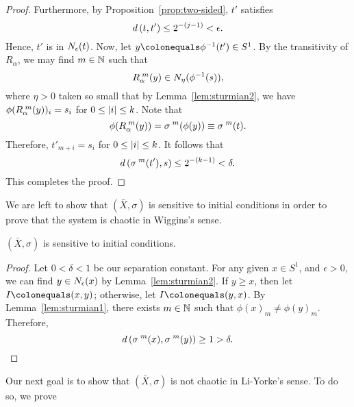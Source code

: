 \documentclass[10pt,twoside,draft]{book}
\begin{document}
\begin{example}
\begin{proposition}
\begin{proof}
      Furthermore, by Proposition~\ref{prop:two-sided}, $t'$ satisfies
      \begin{equation*}
        d\left( t, t' \right) \leq 2^{-(j-1)} < \epsilon.
      \end{equation*}
      Hence, $t'$ is in $N_{\epsilon}(t)$.
      Now, let $y \ceq \phi^{-1}(t') \in S^1$.
      By the transitivity of $R_\alpha$, we may find $m \in \mathbb{N}$ such that
      \begin{equation*}
        R_\alpha^{\;m}(y) \in N_{\eta}(\phi^{-1}(s)),
      \end{equation*}
      where $\eta > 0$ taken so small that by Lemma~\ref{lem:sturmian2}, we have 
      $\phi(R_\alpha^{\;m}(y))_i = s_i$ for $0 \leq \left | i \right | \leq k$.
      Note that
      \begin{equation*}
        \phi(R_\alpha^{\;m}(y)) 
        = \sigma^{\;m}(\phi(y))
        \equiv \sigma^{\;m}(t).
      \end{equation*}
      Therefore, $t'_{m+i} = s_i$ for $0 \leq \left | i \right | \leq k$.
      It follows that 
      \begin{equation*}
        d\left( \sigma^{\;m}(t'), s \right) \leq 2^{-(k-1)} < \delta.
      \end{equation*}
      This completes the proof.
    \end{proof}
  \end{proposition}
  We are left to show that $(\bar{X}, \sigma)$ is sensitive to initial conditions in order to prove that the system is chaotic in Wiggins's sense.
  \begin{proposition}
    $(\bar{X}, \sigma)$ is sensitive to initial conditions.
    \begin{proof}
      Let $0 < \delta < 1$ be our separation constant.
      For any given $x \in S^1$, and $\epsilon > 0$, we can find $y \in N_{\epsilon}(x)$ by Lemma~\ref{lem:sturmian2}.
      If $y \geq x$, then let $I \ceq (x,y)$; otherwise, let $I \ceq (y,x)$.
      By Lemma~\ref{lem:sturmian1}, there exists $m \in \mathbb{N}$ such that $\phi(x)_m \neq \phi(y)_m$.
      Therefore,
      \begin{equation*}
        d\left( \sigma^{\;m}(x), \sigma^{\;m}(y) \right) \geq 1 > \delta.
      \end{equation*}
    \end{proof}
  \end{proposition}
  Our next goal is to show that $(\bar{X}, \sigma)$ is not chaotic in Li-Yorke's sense.
  To do so, we prove 
  \begin{equation*}

\end{equation*}
\end{example}
\end{document}
